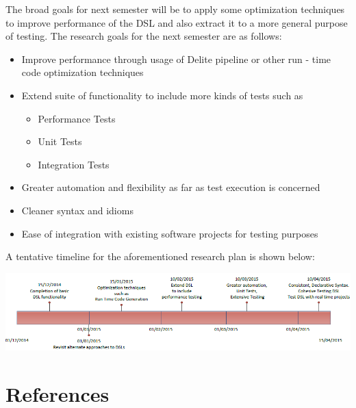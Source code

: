 \documentclass[12 pt]{article}
\begin{document}
\noindent
The broad goals for next semester will be to apply some optimization techniques to improve performance of the DSL and also extract it to a more general purpose of testing. The research goals for the next semester are as follows:
\begin{itemize}
\item Improve performance through usage of Delite pipeline or other run - time code optimization techniques
\item Extend suite of functionality to include more kinds of tests such as
    \begin{itemize}
    \item Performance Tests
    \item Unit Tests
    \item Integration Tests
    \end{itemize}
\item Greater automation and flexibility as far as test execution is concerned
\item Cleaner syntax and idioms
\item Ease of integration with existing software projects for testing purposes
\end{itemize}
\bigskip

\noindent
A tentative timeline for the aforementioned research plan is shown below:
\centerline{\includegraphics[width=600px]{figures/timeline.png}}
\newpage
\section{References}
\end{document}
